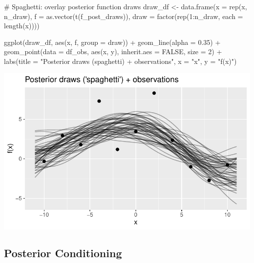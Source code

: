 \documentclass[
  letterpaper,
  DIV=11,
  numbers=noendperiod]{scrartcl}
\newenvironment{Shaded}{\begin{snugshade}}{\end{snugshade}}
\newcommand{\AttributeTok}[1]{\textcolor[rgb]{0.40,0.45,0.13}{#1}}
\newcommand{\CommentTok}[1]{\textcolor[rgb]{0.37,0.37,0.37}{#1}}
\newcommand{\ConstantTok}[1]{\textcolor[rgb]{0.56,0.35,0.01}{#1}}
\newcommand{\DecValTok}[1]{\textcolor[rgb]{0.68,0.00,0.00}{#1}}
\newcommand{\FloatTok}[1]{\textcolor[rgb]{0.68,0.00,0.00}{#1}}
\newcommand{\FunctionTok}[1]{\textcolor[rgb]{0.28,0.35,0.67}{#1}}
\newcommand{\NormalTok}[1]{\textcolor[rgb]{0.00,0.23,0.31}{#1}}
\newcommand{\OtherTok}[1]{\textcolor[rgb]{0.00,0.23,0.31}{#1}}
\newcommand{\SpecialCharTok}[1]{\textcolor[rgb]{0.37,0.37,0.37}{#1}}
\newcommand{\StringTok}[1]{\textcolor[rgb]{0.13,0.47,0.30}{#1}}
\begin{document}
\begin{Shaded}
\begin{Highlighting}[]
\CommentTok{\# Spaghetti: overlay posterior function draws}
\NormalTok{draw\_df }\OtherTok{\textless{}{-}} \FunctionTok{data.frame}\NormalTok{(}\AttributeTok{x =} \FunctionTok{rep}\NormalTok{(x, n\_draw),}
                      \AttributeTok{f =} \FunctionTok{as.vector}\NormalTok{(}\FunctionTok{t}\NormalTok{(f\_post\_draws)),}
                      \AttributeTok{draw =} \FunctionTok{factor}\NormalTok{(}\FunctionTok{rep}\NormalTok{(}\DecValTok{1}\SpecialCharTok{:}\NormalTok{n\_draw, }\AttributeTok{each =} \FunctionTok{length}\NormalTok{(x))))}

\FunctionTok{ggplot}\NormalTok{(draw\_df, }\FunctionTok{aes}\NormalTok{(x, f, }\AttributeTok{group =}\NormalTok{ draw)) }\SpecialCharTok{+}
  \FunctionTok{geom\_line}\NormalTok{(}\AttributeTok{alpha =} \FloatTok{0.35}\NormalTok{) }\SpecialCharTok{+}
  \FunctionTok{geom\_point}\NormalTok{(}\AttributeTok{data =}\NormalTok{ df\_obs, }\FunctionTok{aes}\NormalTok{(x, y), }\AttributeTok{inherit.aes =} \ConstantTok{FALSE}\NormalTok{, }\AttributeTok{size =} \DecValTok{2}\NormalTok{) }\SpecialCharTok{+}
  \FunctionTok{labs}\NormalTok{(}\AttributeTok{title =} \StringTok{"Posterior draws (\textquotesingle{}spaghetti\textquotesingle{}) + observations"}\NormalTok{,}
       \AttributeTok{x =} \StringTok{"x"}\NormalTok{, }\AttributeTok{y =} \StringTok{"f(x)"}\NormalTok{)}
\end{Highlighting}
\end{Shaded}

\includegraphics{GP-simulation-+-inference_files/figure-pdf/unnamed-chunk-5-1.pdf}

\subsection{Posterior Conditioning}\label{posterior-conditioning}
\end{document}
